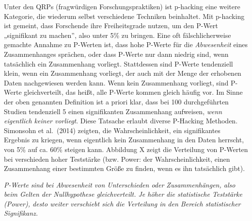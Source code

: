 \documentclass[
  letterpaper,
  DIV=11,
  numbers=noendperiod]{scrreprt}
\begin{document}
Unter den QRPs (fragwürdigen Forschungspraktiken) ist p-hacking eine
weitere Kategorie, die wiederum selbst verschiedene Techniken
beinhaltet. Mit p-hacking ist gemeint, dass Forschende ihre
Freiheitsgrade nutzen, um den P-Wert „signifikant zu machen'', also
unter 5\% zu bringen. Eine oft fälschlicherweise gemachte Annahme zu
P-Werten ist, dass hohe P-Werte für die \emph{Abwesenheit} eines
Zusammenhanges sprächen, oder dass P-Werte nur dann niedrig sind, wenn
tatsächlich ein Zusammenhang vorliegt. Stattdessen sind P-Werte
tendenziell klein, wenn ein Zusammenhang vorliegt, der auch mit der
Menge der erhobenen Daten nachgewiesen werden kann. Wenn kein
Zusammenhang vorliegt, sind P-Werte gleichverteilt, das heißt, alle
P-Werte kommen gleich häufig vor. Im Sinne der oben genannten Definition
ist a priori klar, dass bei 100 durchgeführten Studien tendenziell 5
einen signifikanten Zusammenhang aufweisen, \emph{wenn eigentlich keiner
vorliegt}. Diese Tatsache erlaubt diverse P-Hacking Methoden. Simonsohn
et al.~(2014) zeigten, die Wahrscheinlichkeit, ein signifikantes
Ergebnis zu kriegen, wenn eigentlich kein Zusammenhang in den Daten
herrscht, von 5\% auf ca. 60\% steigen kann. Abbildung X zeigt die
Verteilung von P-Werten bei verschieden hoher Teststärke (bzw. Power:
der Wahrscheinlichkeit, einen Zusammenhang einer bestimmten Größe zu
finden, wenn es ihn tatsächlich gibt).

\emph{P-Werte sind bei Abwesenheit von Unterschieden oder
Zusammenhängen, also beim Gelten der Nullhypothese gleichverteilt. Je
höher die statistische Teststärke (Power), desto weiter verschiebt sich
die Verteilung in den Bereich statistischer Signifikanz.}
\end{document}
